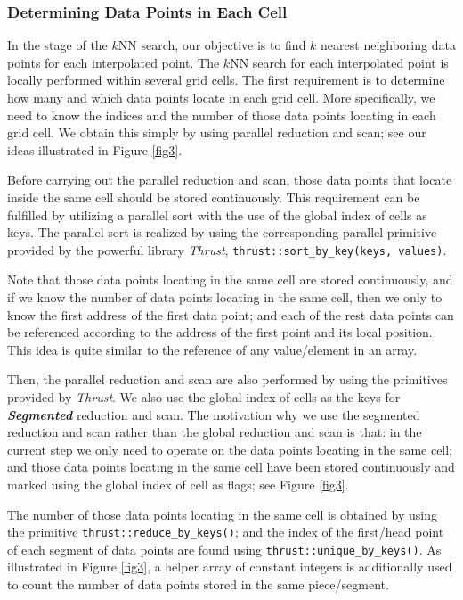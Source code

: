 \documentclass[final,5p,times,twocolumn,authoryear]{elsarticle}
\begin{document}
			\subsubsection{Determining Data Points in Each Cell}
			
			In the stage of the $k$NN search, our objective is to find $k$ nearest neighboring 
			data points for each interpolated point. The $k$NN search for each interpolated 
			point is locally performed within several grid cells. The first requirement 
			is to determine how many and which data points locate in each grid cell. 
			More specifically, we need to know the indices and the number of those data 
			points locating in each grid cell. We obtain this simply by using parallel 
			reduction and scan; see our ideas illustrated in Figure \ref{fig3}.
			
			Before carrying out the parallel reduction and scan, those data points that 
			locate inside the same cell should be stored continuously. This requirement 
			can be fulfilled by utilizing a parallel sort with the use of the global index 
			of cells as keys. The parallel sort is realized by using the corresponding 
			parallel primitive provided by the powerful library \textit{Thrust}, 
			\texttt{thrust::sort{\_}by{\_}key(keys, values)}.
			
			Note that those data points locating in the same cell are stored 
			continuously, and if we know the number of data points locating in the same 
			cell, then we only to know the first address of the first data point; and 
			each of the rest data points can be referenced according to the address of 
			the first point and its local position. This idea is quite similar to the 
			reference of any value/element in an array. 
			
			Then, the parallel reduction and scan are also performed by using the 
			primitives provided by \textit{Thrust}. We also use the global index of cells as the keys 
			for \textbf{\textit{Segmented}} reduction and scan. The motivation why we 
			use the segmented reduction and scan rather than the global reduction and 
			scan is that: in the current step we only need to operate on the data points 
			locating in the same cell; and those data points locating in the same cell 
			have been stored continuously and marked using the global index of cell as 
			flags; see Figure \ref{fig3}.
			
			The number of those data points locating in the same cell is obtained by 
			using the primitive \texttt{thrust::reduce{\_}by{\_}keys()}; and the index of the 
			first/head point of each segment of data points are found using 
			\texttt{thrust::unique{\_}by{\_}keys()}. As illustrated in Figure \ref{fig3}, a helper array 
			of constant integers is additionally used to count the number of data points 
			stored in the same piece/segment. 
			
\end{document}
